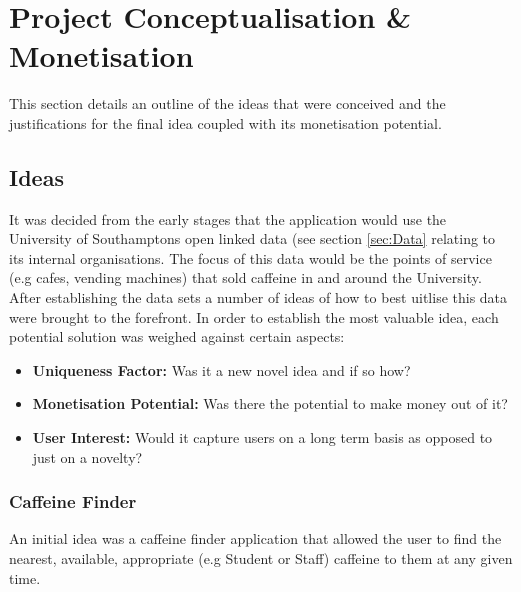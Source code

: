 \section{Project Conceptualisation \& Monetisation}

This section details an outline of the ideas that were conceived and the justifications for the final idea coupled with its monetisation potential. 

\subsection{Ideas}

It was decided from the early stages that the application would use the University of Southamptons open linked data (see section \ref{sec:Data} relating to its internal organisations. The focus of this data would be the points of service (e.g cafes, vending machines) that sold caffeine in and around the University. After establishing the data sets a number of ideas of how to best uitlise this data were brought to the forefront. In order to establish the most valuable idea, each potential solution was weighed against certain aspects: 

\begin{itemize}
	\item{\textbf{Uniqueness Factor:} Was it a new novel idea and if so how?}
	\item{\textbf{Monetisation Potential:} Was there the potential to make money out of it?}
	\item{\textbf{User Interest:} Would it capture users on a long term basis as opposed to just on a novelty?}
\end{itemize}

\subsubsection{Caffeine Finder}
An initial idea was a caffeine finder application that allowed the user to find the nearest, available, appropriate (e.g Student or Staff) caffeine to them at any given time. 

